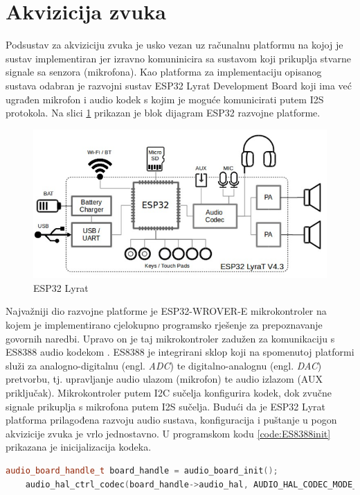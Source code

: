 \section{Akvizicija zvuka}
\label{sec:acq}

Podsustav za akviziciju zvuka je usko vezan uz računalnu platformu na kojoj
je sustav implementiran jer izravno komuninicira
sa sustavom koji prikuplja stvarne signale sa senzora (mikrofona).
Kao platforma za implementaciju opisanog sustava odabran je razvojni sustav ESP32 Lyrat Development Board \cite{lyrat} koji ima već ugrađen mikrofon i audio kodek
s kojim je moguće komunicirati putem I2S protokola. Na slici
\ref{pic:esp} prikazan je blok dijagram ESP32 razvojne platforme.

\begin{figure}[htb]
    \centering
    \includegraphics[width=0.75\linewidth]{Chapters/struktura_sustava/akvizicija/lyrat.png} 
    \caption{ESP32 Lyrat \cite{lyrat}}
    \label{pic:esp}
\end{figure}

Najvažniji dio razvojne platforme je ESP32-WROVER-E mikrokontroler
na kojem je implementirano cjelokupno programsko rješenje za prepoznavanje govornih naredbi. Upravo on je taj mikrokontroler zadužen za komunikaciju s ES8388 
audio kodekom \cite{es8388}. ES8388 je integrirani sklop koji na spomenutoj
platformi služi za analogno-digitalnu (engl. \textit{ADC}) te digitalno-analognu 
(engl. \textit{DAC}) pretvorbu, tj. upravljanje audio ulazom (mikrofon) te audio
izlazom (AUX priključak). Mikrokontroler putem I2C sučelja konfigurira kodek,
dok zvučne signale prikuplja s mikrofona putem I2S sučelja. Budući da je ESP32 Lyrat
platforma prilagođena razvoju audio sustava, konfiguracija i puštanje u pogon
akvizicije zvuka je vrlo jednostavno. U programskom kodu \ref{code:ES8388init}
prikazana je inicijalizacija kodeka.

\begin{lstlisting}[language=C++, caption=Inicijalizacija kodeka, label=code:ES8388init]
    audio_board_handle_t board_handle = audio_board_init();
    audio_hal_ctrl_codec(board_handle->audio_hal, AUDIO_HAL_CODEC_MODE_ENCODE, AUDIO_HAL_CTRL_START);
\end{lstlisting}

